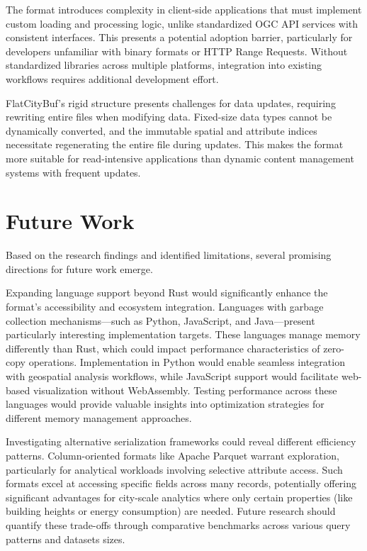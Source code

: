 The format introduces complexity in client-side applications that must implement custom loading and processing logic, unlike standardized OGC API services with consistent interfaces. This presents a potential adoption barrier, particularly for developers unfamiliar with binary formats or HTTP Range Requests. Without standardized libraries across multiple platforms, integration into existing workflows requires additional development effort.

FlatCityBuf's rigid structure presents challenges for data updates, requiring rewriting entire files when modifying data. Fixed-size data types cannot be dynamically converted, and the immutable spatial and attribute indices necessitate regenerating the entire file during updates. This makes the format more suitable for read-intensive applications than dynamic content management systems with frequent updates.

\section{Future Work}
\label{conclusion:future_work}

Based on the research findings and identified limitations, several promising directions for future work emerge.

Expanding language support beyond Rust would significantly enhance the format's accessibility and ecosystem integration. Languages with garbage collection mechanisms—such as Python, JavaScript, and Java—present particularly interesting implementation targets. These languages manage memory differently than Rust, which could impact performance characteristics of zero-copy operations. Implementation in Python would enable seamless integration with geospatial analysis workflows, while JavaScript support would facilitate web-based visualization without WebAssembly. Testing performance across these languages would provide valuable insights into optimization strategies for different memory management approaches.

Investigating alternative serialization frameworks could reveal different efficiency patterns. Column-oriented formats like Apache Parquet warrant exploration, particularly for analytical workloads involving selective attribute access. Such formats excel at accessing specific fields across many records, potentially offering significant advantages for city-scale analytics where only certain properties (like building heights or energy consumption) are needed. Future research should quantify these trade-offs through comparative benchmarks across various query patterns and datasets sizes.

